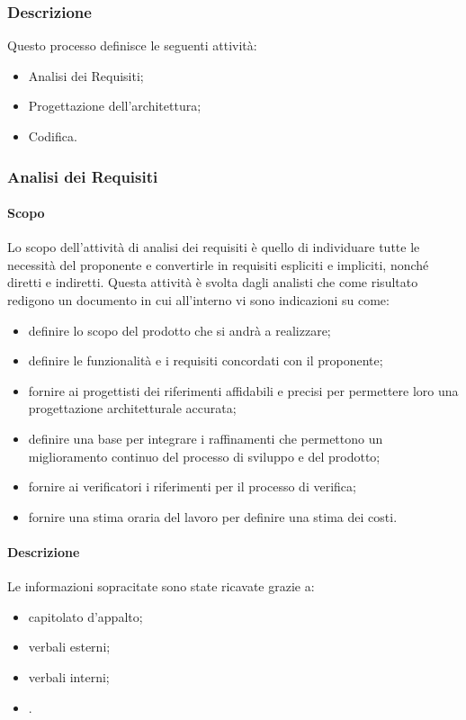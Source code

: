 \subsubsection{Descrizione}
Questo processo definisce le seguenti attività:
\begin{itemize}
  \item Analisi dei Requisiti;
  \item Progettazione dell'architettura;
  \item Codifica.
\end{itemize}
\subsubsection{Analisi dei Requisiti}
\label{_processoAnalisiDeiRequisiti}
\paragraph{Scopo}
Lo scopo dell'attività di analisi dei requisiti è quello di individuare tutte le necessità del proponente e convertirle in requisiti espliciti e impliciti, nonché diretti e indiretti. Questa attività è svolta dagli analisti che come risultato redigono un documento in cui all'interno vi sono indicazioni su come:
\begin{itemize}
  \item definire lo scopo del prodotto che si andrà a realizzare;
  \item definire le funzionalità e i requisiti concordati con il proponente;
  \item fornire ai progettisti dei riferimenti affidabili e precisi per permettere loro una progettazione architetturale accurata;
  \item definire una base per integrare i raffinamenti che permettono un miglioramento continuo del processo di sviluppo e del prodotto;
  \item fornire ai verificatori i riferimenti per il processo di verifica;
  \item fornire una stima oraria del lavoro per definire una stima dei costi.
\end{itemize}

\paragraph{Descrizione}
Le informazioni sopracitate sono state ricavate grazie a:
\begin{itemize}
  \item capitolato d'appalto;
  \item verbali esterni;
  \item verbali interni;
  \item {}.
\end{itemize}

